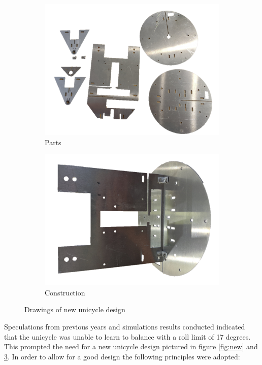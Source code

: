 \documentclass[twoside,twocolumn,12pt]{article}
\begin{document}
\begin{figure}[t!]
  \centering
  \begin{subfigure}[t]{\textwidth}
    \includegraphics[width=\linewidth]{partst}
   \caption{Parts}
  \label{sub:parts}
  \end{subfigure}  
  \newline  
  \begin{subfigure}[t]{0.6\textwidth}
    \includegraphics[width=\linewidth]{buildt}
    \caption{Construction}
  \label{sub:con}
  \end{subfigure}
  
  \caption{Drawings of new unicycle design}
  \label{fig:parts}
\end{figure}
\clearpage
{}%
Speculations from previous years and simulations results conducted indicated that the unicycle was unable to learn to balance with a roll limit of 17 degrees. This prompted the need for a new unicycle design pictured in figure \ref{fig:new} and \ref{fig:parts}. In order to allow for a good design the following principles were adopted:
\end{document}
